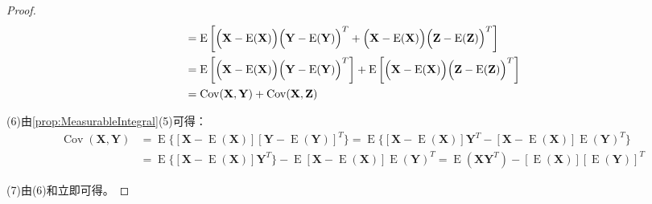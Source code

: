 \begin{proof}
\begin{gather*}
\begin{aligned}
			&=\operatorname{E}\left[\Bigl(\mathbf{X}-\operatorname{E}(\mathbf{X})\Bigr)\Bigl(\mathbf{Y}-\operatorname{E}(\mathbf{Y})\Bigr)^T+\Bigl(\mathbf{X}-\operatorname{E}(\mathbf{X})\Bigr)\Bigl(\mathbf{Z}-\operatorname{E}(\mathbf{Z})\Bigr)^T\right] \\
			&=\operatorname{E}\left[\Bigl(\mathbf{X}-\operatorname{E}(\mathbf{X})\Bigr)\Bigl(\mathbf{Y}-\operatorname{E}(\mathbf{Y})\Bigr)^T\right]+\operatorname{E}\left[\Bigl(\mathbf{X}-\operatorname{E}(\mathbf{X})\Bigr)\Bigl(\mathbf{Z}-\operatorname{E}(\mathbf{Z})\Bigr)^T\right] \\
			&=\operatorname{Cov}(\mathbf{X},\mathbf{Y})+\operatorname{Cov}(\mathbf{X},\mathbf{Z})
		\end{aligned}
	\end{gather*}\par
	(6)由\cref{prop:MeasurableIntegral}(5)可得：
	\begin{align*}
		\operatorname{Cov}(\mathbf{X},\mathbf{Y})
		&=\operatorname{E}\{[\mathbf{X}-\operatorname{E}(\mathbf{X})][\mathbf{Y}-\operatorname{E}(\mathbf{Y})]^T\}
		=\operatorname{E}\{[\mathbf{X}-\operatorname{E}(\mathbf{X})]\mathbf{Y}^T-[\mathbf{X}-\operatorname{E}(\mathbf{X})]\operatorname{E}(\mathbf{Y})^T\} \\
		&=\operatorname{E}\{[\mathbf{X}-\operatorname{E}(\mathbf{X})]\mathbf{Y}^T\}-\operatorname{E}[\mathbf{X}-\operatorname{E}(\mathbf{X})]\operatorname{E}(\mathbf{Y})^T =\operatorname{E}(\mathbf{X}\mathbf{Y}^T)-[\operatorname{E}(\mathbf{X})][\operatorname{E}(\mathbf{Y})]^T
	\end{align*}\par
	(7)由(6)和立即可得。
\end{proof}


